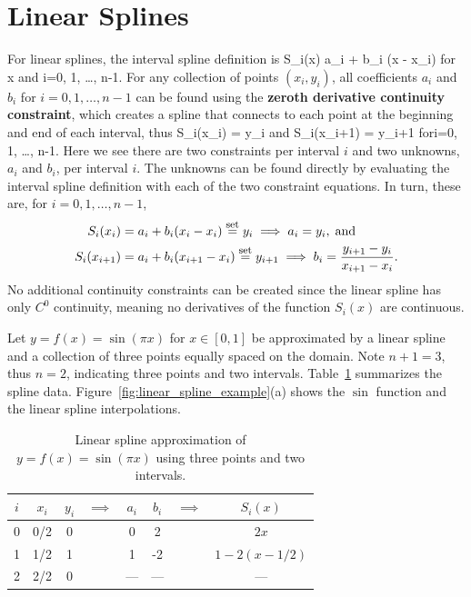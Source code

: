 \section{Linear Splines}
For linear splines, the interval spline definition is
\be
S_i(x) 
a_i + b_i (x - x_i)
\;\;\;
\mbox{for}
\; x \in [x_i, x_{i+1}] \;\mbox{and}\; i=0, 1, \ldots, n-1.
\ee
For any collection of points $(x_i, y_i)$, all coefficients $a_i$ and
$b_i$ for $i=0, 1, \ldots, n-1$ can be found using the {\bf zeroth derivative
continuity constraint}, which creates a spline that connects to each point
at the beginning and end of each interval, thus
\be
S_i(x_i) = y_i 
\;\;\;
\mbox{and}
\;\;\; 
S_i(x_{i+1}) = y_{i+1}
\;\;\;\mbox{for}\;i=0, 1, \ldots, n-1.
\ee
Here we see there are two constraints per interval $i$ and two unknowns, 
$a_i$ and $b_i$, per interval $i$.  The unknowns can be found directly by
evaluating the interval spline definition with each of the two constraint
equations.  In turn, these are, for 
$i=0, 1, \ldots, n-1$,
\begin{align}
S_i(x_i) 
&
= a_i + b_i(x_i - x_i) 
\overset{\mbox{\footnotesize set}}{=} y_i 
\implies 
a_i = y_i, \;\mbox{and}
\\
S_i(x_{i+1}) 
& 
= a_i + b_i (x_{i+1} - x_i) 
\overset{\mbox{\footnotesize set}}{=} y_{i+1}
\implies
b_i = \frac{y_{i+1} - y_i}{x_{i+1} - x_i}.
\end{align}
No additional continuity constraints can be created since the linear
spline has only $C^0$ continuity, meaning no derivatives of the 
function $S_i(x)$ are continuous.

\begin{Hexpo}
{Let $y = f(x) = \sin(\pi x)$ for $x \in [0, 1]$ be approximated by a linear
spline and a collection of three points equally spaced on the domain.  
Note $n+1 = 3$, thus $n=2$, indicating three points and two intervals.
Table~\ref{tab:linear_spline_example} summarizes the spline data.
Figure~\ref{fig:linear_spline_example}(a) shows the $\sin$ function and the
linear spline interpolations.
\begin{table}[h]
\caption{Linear spline approximation of $y = f(x) = \sin(\pi x)$ 
using three points and two intervals.}
\begin{center}
\begin{tabular}{c|c|ccc|ccc}
$i$ & $x_i$ & $y_i$ & $\implies$  & $a_i$ & $b_i$ & $\implies$ & $S_i(x)$
\\
\hline \hline
0 & 0/2 & 0 &  & 0 & 2 &   & $2 x$
\\
1 & 1/2 & 1 &  & 1 & -2 &   & $1 - 2(x - 1/2)$
\\
2 & 2/2 & 0 &  & --- & --- &   & ---
\end{tabular}
\end{center}
\label{tab:linear_spline_example}
\end{table}
} %
\end{Hexpo}

